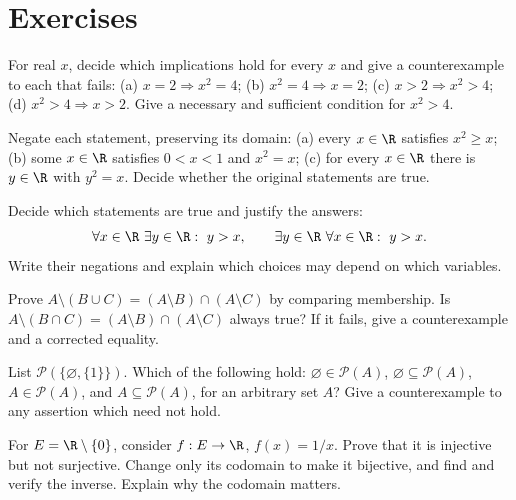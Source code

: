 \section{Exercises}

\begin{exercise}[$\star$]\label{ex:lang-implications}
For real $x$, decide which implications hold for every $x$ and give a counterexample
to each that fails:
(a) $x=2\Rightarrow x^2=4$;
(b) $x^2=4\Rightarrow x=2$;
(c) $x>2\Rightarrow x^2>4$;
(d) $x^2>4\Rightarrow x>2$.
Give a necessary and sufficient condition for $x^2>4$.
\end{exercise}

\begin{exercise}[$\star$]\label{ex:lang-negation}
Negate each statement, preserving its domain:
(a) every $x\in\R$ satisfies $x^2\ge x$;
(b) some $x\in\R$ satisfies $0<x<1$ and $x^2=x$;
(c) for every $x\in\R$ there is $y\in\R$ with $y^2=x$.
Decide whether the original statements are true.
\end{exercise}

\begin{exercise}[$\star$]\label{ex:lang-quantifiers}
Decide which statements are true and justify the answers:
\[
\forall x\in\R\ \exists y\in\R:\ y>x,
\qquad
\exists y\in\R\ \forall x\in\R:\ y>x.
\]
Write their negations and explain which choices may depend on which variables.
\end{exercise}

\begin{exercise}[$\star$]\label{ex:lang-setalgebra}
Prove $A\setminus(B\cup C)=(A\setminus B)\cap(A\setminus C)$ by comparing
membership. Is $A\setminus(B\cap C)=(A\setminus B)\cap(A\setminus C)$ always true?
If it fails, give a counterexample and a corrected equality.
\end{exercise}

\begin{exercise}[$\star$]\label{ex:lang-powerset}
List $\mathcal P(\{\varnothing,\{1\}\})$. Which of the following hold:
$\varnothing\in\mathcal P(A)$, $\varnothing\subseteq\mathcal P(A)$,
$A\in\mathcal P(A)$, and $A\subseteq\mathcal P(A)$, for an arbitrary set $A$?
Give a counterexample to any assertion which need not hold.
\end{exercise}

\begin{exercise}[$\star\star$]\label{ex:lang-domain}
For $E=\R\setminus\{0\}$, consider $f:E\to\R$, $f(x)=1/x$.
Prove that it is injective but not surjective. Change only its codomain to make
it bijective, and find and verify the inverse. Explain why the codomain matters.
\end{exercise}

